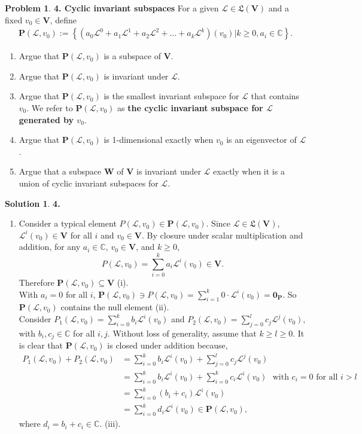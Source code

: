\documentclass{book}
\theoremstyle{definition}
\newtheorem*{prob*}{Problem}
\newtheorem*{sln*}{Solution}
\newcommand{\V}{\mathbf{V}}
\newcommand{\W}{\mathbf{W}}
\newcommand{\lag}{\mathcal{L}}
\begin{document}
\newpage

\begin{prob*}\textbf{4. Cyclic invariant subspaces}
	For a given $\lag\in\mathfrak{L}(\V)$ and a fixed $v_0 \in \V$, define
	\begin{align*}
	\mathbf{P}(\lag,v_0) := \left\{ \left(a_0 \lag^0 + a_1\lag^1 + a_2\lag^2 + \dots + a_k \lag^k\right)(v_0)\bigg\vert k \geq 0, a_i \in \mathbb{C} \right\}.
	\end{align*}
	\begin{enumerate}
		\item Argue that $\mathbf{P}(\lag,v_0)$ is a subspace of $\V$.
		\item Argue that $\mathbf{P}(\lag,v_0)$ is invariant under $\lag$.
		\item Argue that $\mathbf{P}(\lag,v_0)$ is the smallest invariant subspace for $\lag$ that contains $v_0$. We refer to $\mathbf{P}(\lag,v_0)$ as \textbf{the cyclic invariant subspace for $\lag$ generated by $v_0$}.
		\item Argue that $\mathbf{P}(\lag,v_0)$ is 1-dimensional exactly when $v_0$ is an eigenvector of $\lag$.
		\item Argue that a subspace $\W$ of $\V$ is invariant under $\lag$ exactly when it is a union of cyclic invariant subspaces for $\lag$. 
	\end{enumerate}
	
	\begin{sln*}\textbf{4.}
		$\,$
		\begin{enumerate}
			\item Consider a typical element $P(\lag, v_0) \in \mathbf{P}(\lag,v_0) $. Since $\lag \in \mathfrak{L}(\V)$, $\lag^i(v_0) \in \V$ for all $i$ and $v_0 \in \V$. By closure under scalar multiplication and addition, for any $a_i\in \mathbb{C}$, $v_0\in \V$, and $k\geq 0$, $$ P(\lag, v_0) = \sum_{i=0}^k a_i \lag^i(v_0) \in \V.$$ Therefore $\mathbf{P}(\lag,v_0) \subseteq \V$ (i).\\
			
			With $a_i = 0$ for all $i$, $ \mathbf{P}(\lag,v_0) \ni P(\lag, v_0) = \sum^k_{i=1}0\cdot\lag^i(v_0) = \mathbf{0}_\mathbf{P}$. So $\mathbf{P}(\lag,v_0)$ contains the null element (ii).\\
			
			Consider $P_1(\lag, v_0) = \sum^k_{i=0}b_i\lag^i(v_0)$ and $P_2(\lag,v_0) = \sum^l_{j=0}c_j\lag^j(v_0)$, with $b_i, c_j \in \mathbb{C}$ for all $i,j$. Without loss of generality, assume that $k\geq l \geq 0$. It is clear that $\mathbf{P}(\lag,v_0)$ is closed under addition because, 
			\begin{align*}
			P_1(\lag,v_0) + P_2(\lag,v_0) &= \sum^k_{i=0}b_i\lag^i(v_0) + \sum^l_{j=0}c_j\lag^j(v_0)\\
			&= \sum^k_{i=0}b_i\lag^i(v_0) + \sum^k_{i=0}c_i\lag^i(v_0)\,\,\,\, \text{with }c_i = 0 \text{ for all } i > l\\
			&= \sum^k_{i=0}(b_i + c_i)\lag^i(v_0)\\ 
			&= \sum^k_{i=0}d_i\lag^i(v_0) \in \mathbf{P}(\lag,v_0),
			\end{align*}
			where $d_i = b_i + c_i \in \mathbb{C}$. (iii).\\ 
			

\end{enumerate}
\end{sln*}
\end{prob*}
\end{document}
